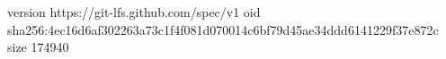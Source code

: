 version https://git-lfs.github.com/spec/v1
oid sha256:4ec16d6af302263a73c1f4f081d070014c6bf79d45ae34ddd6141229f37e872c
size 174940
